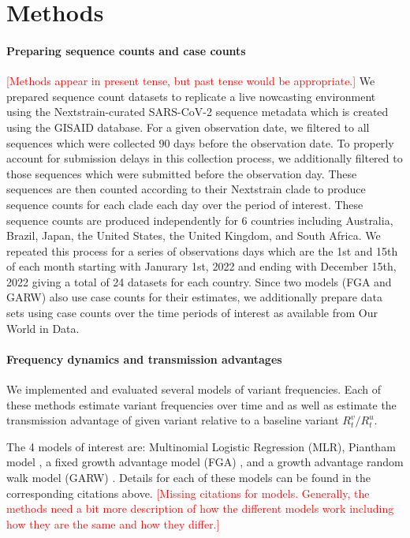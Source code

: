 \documentclass[11pt,oneside,letterpaper]{article}
\def\jhc#1{\textcolor{red}{[#1]}}
\begin{document}
\section*{Methods}

\paragraph{Preparing sequence counts and case counts}

\jhc{Methods appear in present tense, but past tense would be appropriate.}
We prepared sequence count datasets to replicate a live nowcasting environment using the Nextstrain-curated SARS-CoV-2 sequence metadata which is created using the GISAID database.
For a given observation date, we filtered to all sequences which were collected 90 days before the observation date.
To properly account for submission delays in this collection process, we additionally filtered to those sequences which were submitted before the observation day.
These sequences are then counted according to their Nextstrain clade to produce sequence counts for each clade each day over the period of interest.
These sequence counts are produced independently for 6 countries including Australia, Brazil, Japan, the United States, the United Kingdom, and South Africa.
We repeated this process for a series of observations days which are the 1st and 15th of each month starting with  Janurary 1st, 2022 and ending with December 15th, 2022 giving a total of 24 datasets for each country.
Since two models (FGA and GARW) also use case counts for their estimates, we additionally prepare data sets using case counts over the time periods of interest as available from Our World in Data.

\paragraph{Frequency dynamics and transmission advantages}%

We implemented and evaluated several models of variant frequencies.
Each of these methods estimate variant frequencies over time and as well as estimate the transmission advantage of given variant relative to a baseline variant $R_{t}^{v} / R_{t}^{u}$.

The 4 models of interest are: Multinomial Logistic Regression (MLR), Piantham model \cite{piantham2021estimating}, a fixed growth advantage model (FGA)  \cite{figgins_bedford_freq_dyn}, and a growth advantage random walk model (GARW)  \cite{figgins_bedford_freq_dyn}.
Details for each of these models can be found in the corresponding citations above.
\jhc{Missing citations for models. Generally, the methods need a bit more description of how the different models work including how they are the same and how they differ.}
\end{document}

